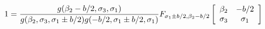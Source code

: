 \begin{equation}
1=\frac{g(\beta_{2}-b/2,\sigma_{3},\sigma_{1})}{g(\beta_{2},\sigma_{3},\sigma_{1}\pm
b/2 )g(-b/2,\sigma_{1}\pm b/2 ,\sigma_{1})}F_{\sigma_{1}\pm
b/2,\beta_{2}-b/2}\left[
\begin{array}
[c]{cc}%
\beta_{2}     & -b/2\\
\sigma_{3}    &   \sigma_{1}%
\end{array}
\right] \nonumber
\end{equation}

